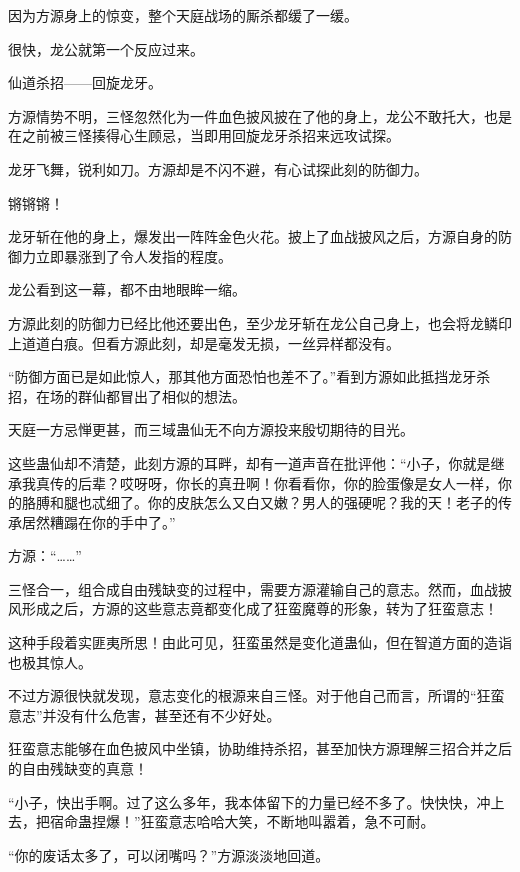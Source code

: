 
\begin{this_body}

因为方源身上的惊变，整个天庭战场的厮杀都缓了一缓。

很快，龙公就第一个反应过来。

仙道杀招——回旋龙牙。

方源情势不明，三怪忽然化为一件血色披风披在了他的身上，龙公不敢托大，也是在之前被三怪揍得心生顾忌，当即用回旋龙牙杀招来远攻试探。

龙牙飞舞，锐利如刀。方源却是不闪不避，有心试探此刻的防御力。

锵锵锵！

龙牙斩在他的身上，爆发出一阵阵金色火花。披上了血战披风之后，方源自身的防御力立即暴涨到了令人发指的程度。

龙公看到这一幕，都不由地眼眸一缩。

方源此刻的防御力已经比他还要出色，至少龙牙斩在龙公自己身上，也会将龙鳞印上道道白痕。但看方源此刻，却是毫发无损，一丝异样都没有。

“防御方面已是如此惊人，那其他方面恐怕也差不了。”看到方源如此抵挡龙牙杀招，在场的群仙都冒出了相似的想法。

天庭一方忌惮更甚，而三域蛊仙无不向方源投来殷切期待的目光。

这些蛊仙却不清楚，此刻方源的耳畔，却有一道声音在批评他：“小子，你就是继承我真传的后辈？哎呀呀，你长的真丑啊！你看看你，你的脸蛋像是女人一样，你的胳膊和腿也忒细了。你的皮肤怎么又白又嫩？男人的强硬呢？我的天！老子的传承居然糟蹋在你的手中了。”

方源：“……”

三怪合一，组合成自由残缺变的过程中，需要方源灌输自己的意志。然而，血战披风形成之后，方源的这些意志竟都变化成了狂蛮魔尊的形象，转为了狂蛮意志！

这种手段着实匪夷所思！由此可见，狂蛮虽然是变化道蛊仙，但在智道方面的造诣也极其惊人。

不过方源很快就发现，意志变化的根源来自三怪。对于他自己而言，所谓的“狂蛮意志”并没有什么危害，甚至还有不少好处。

狂蛮意志能够在血色披风中坐镇，协助维持杀招，甚至加快方源理解三招合并之后的自由残缺变的真意！

“小子，快出手啊。过了这么多年，我本体留下的力量已经不多了。快快快，冲上去，把宿命蛊捏爆！”狂蛮意志哈哈大笑，不断地叫嚣着，急不可耐。

“你的废话太多了，可以闭嘴吗？”方源淡淡地回道。


\end{this_body}
